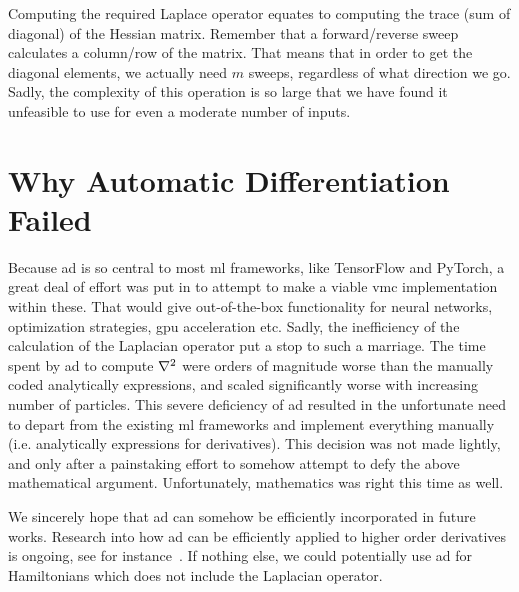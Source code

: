 \documentclass[Thesis.tex]{subfiles}
\begin{document}
Computing the required Laplace operator equates to computing the trace (sum of
diagonal) of the Hessian matrix. Remember that a forward/reverse sweep
calculates a column/row of the matrix. That means that in order to get the
diagonal elements, we actually need $m$ sweeps, regardless of what direction we
go. Sadly, the complexity of this operation is so large that we have found it
unfeasible to use for even a moderate number of inputs.


\section{Why Automatic Differentiation Failed}

Because \gls{ad} is so central to most \gls{ml} frameworks, like TensorFlow and PyTorch, a
great deal of effort was put in to attempt to make a viable \gls{vmc} implementation
within these. That would give out-of-the-box functionality for neural networks,
optimization strategies, \acrshort{gpu} acceleration etc. Sadly, the inefficiency of the
calculation of the Laplacian operator put a stop to such a marriage. The time
spent by \gls{ad} to compute $\laplacian$ were orders of magnitude worse than the
manually coded analytically expressions, and scaled significantly worse with
increasing number of particles. This severe deficiency of \gls{ad} resulted
in the unfortunate need to depart from the existing \gls{ml} frameworks and
implement everything manually (i.e. analytically expressions for derivatives).
This decision was not made lightly, and only after a painstaking effort to
somehow attempt to defy the above mathematical argument. Unfortunately,
mathematics was right this time as well.

We sincerely hope that \gls{ad} can somehow be efficiently incorporated in future
works. Research into how \gls{ad} can be efficiently applied to higher order
derivatives is ongoing, see for instance~\textcite{wang2017}. If nothing else,
we could potentially use \gls{ad} for Hamiltonians which does not include the Laplacian
operator.

\end{document}

